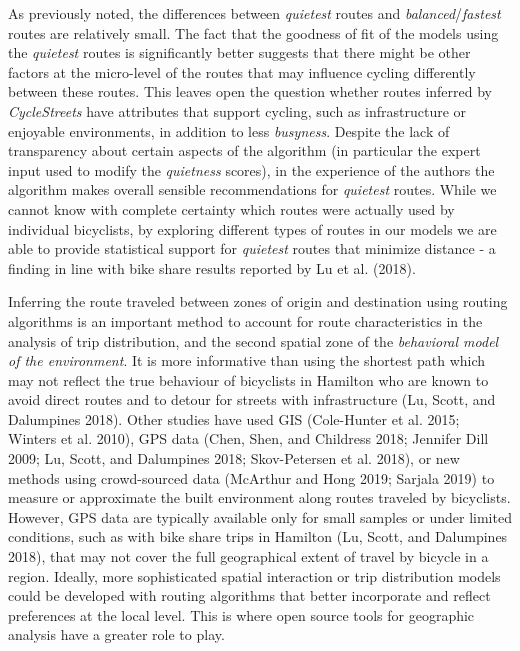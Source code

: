 \documentclass[smallextended]{svjour3}       %
\begin{document}
As previously noted, the differences between \emph{quietest} routes and
\emph{balanced}/\emph{fastest} routes are relatively small. The fact
that the goodness of fit of the models using the \emph{quietest} routes
is significantly better suggests that there might be other factors at
the micro-level of the routes that may influence cycling differently
between these routes. This leaves open the question whether routes
inferred by \emph{CycleStreets} have attributes that support cycling,
such as infrastructure or enjoyable environments, in addition to less
\emph{busyness}. Despite the lack of transparency about certain aspects
of the algorithm (in particular the expert input used to modify the
\emph{quietness} scores), in the experience of the authors the algorithm
makes overall sensible recommendations for \emph{quietest} routes. While
we cannot know with complete certainty which routes were actually used
by individual bicyclists, by exploring different types of routes in our
models we are able to provide statistical support for \emph{quietest}
routes that minimize distance - a finding in line with bike share
results reported by Lu et al. (2018).

Inferring the route traveled between zones of origin and destination
using routing algorithms is an important method to account for route
characteristics in the analysis of trip distribution, and the second
spatial zone of the \emph{behavioral model of the environment}. It is
more informative than using the shortest path which may not reflect the
true behaviour of bicyclists in Hamilton who are known to avoid direct
routes and to detour for streets with infrastructure (Lu, Scott, and
Dalumpines 2018). Other studies have used GIS (Cole-Hunter et al. 2015;
Winters et al. 2010), GPS data (Chen, Shen, and Childress 2018; Jennifer
Dill 2009; Lu, Scott, and Dalumpines 2018; Skov-Petersen et al. 2018),
or new methods using crowd-sourced data (McArthur and Hong 2019; Sarjala
2019) to measure or approximate the built environment along routes
traveled by bicyclists. However, GPS data are typically available only
for small samples or under limited conditions, such as with bike share
trips in Hamilton (Lu, Scott, and Dalumpines 2018), that may not cover
the full geographical extent of travel by bicycle in a region. Ideally,
more sophisticated spatial interaction or trip distribution models could
be developed with routing algorithms that better incorporate and reflect
preferences at the local level. This is where open source tools for
geographic analysis have a greater role to play.
\end{document}
